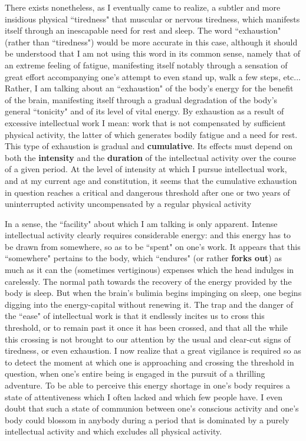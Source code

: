 There exists nonetheless, as I eventually came to realize, a subtler and more insidious physical ``tiredness" that muscular or nervous tiredness, which manifests itself through an inescapable need for rest and sleep. The word ``exhaustion" (rather than ``tiredness") would be more accurate in this case, although it should be understood that I am not using this word in its common sense, namely that of an extreme feeling of fatigue, manifesting itself notably through a sensation of great effort accompanying one's attempt to even stand up, walk a few steps, etc... Rather, I am talking about an ``exhaustion" of the body's energy for the benefit of the brain, manifesting itself through a gradual degradation of the body's general ``tonicity" and of its level of vital energy. By exhaustion as a result of excessive intellectual work I mean: work that is not compensated by sufficient physical activity, the latter of which generates bodily fatigue and a need for rest. This type of exhaustion is gradual and \textbf{cumulative}. Its effects must depend on both the \textbf{intensity} and the \textbf{duration} of the intellectual activity over the course of a given period. At the level of intensity at which I pursue intellectual work, and at my current age and constitution, it seems that the cumulative exhaustion in question reaches a critical and dangerous threshold after one or two years of uninterrupted activity uncompensated by a regular physical activity

In a sense, the ``facility" about which I am talking is only apparent. Intense intellectual activity clearly requires considerable energy: and this energy has to be drawn from somewhere, so as to be ``spent" on one's work. It appears that this ``somewhere" pertains to the body, which ``endures" (or rather \textbf{forks out}) as much as it can the (sometimes vertiginous) expenses which the head indulges in carelessly. The normal path towards the recovery of the energy provided by the body is sleep. But when the brain's bulimia begins impinging on sleep, one begins digging into the energy-capital without renewing it. The trap and the danger of the ``ease" of intellectual work is that it endlessly incites us to cross this threshold, or to remain past it once it has been crossed, and that all the while this crossing is not brought to our attention by the usual and clear-cut signs of tiredness, or even exhaustion. I now realize that a great vigilance is required so as to detect the moment at which one is approaching and crossing the threshold in question, when one's entire being is engaged in the pursuit of a thrilling adventure. To be able to perceive this energy shortage in one's body requires a state of attentiveness which I often lacked and which few people have. I even doubt that such a state of communion between one's conscious activity and one's body could blossom in anybody during a period that is dominated by a purely intellectual activity and which excludes all physical activity.

